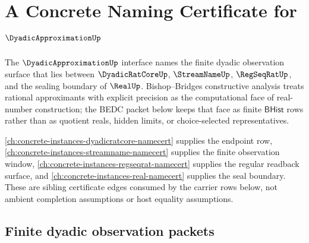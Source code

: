 \chapter{A Concrete Naming Certificate for $\DyadicApproximationUp$}
\label{ch:concrete-instances-dyadicapproximation-namecert}

The $\DyadicApproximationUp$ interface names the finite dyadic observation surface that lies between $\DyadicRatCoreUp$, $\StreamNameUp$, $\RegSeqRatUp$, and the sealing boundary of $\RealUp$. Bishop--Bridges constructive analysis treats rational approximants with explicit precision as the computational face of real-number construction; the BEDC packet below keeps that face as finite $\mathsf{BHist}$ rows rather than as quotient reals, hidden limits, or choice-selected representatives.

\autoref{ch:concrete-instances-dyadicratcore-namecert} supplies the endpoint row, \autoref{ch:concrete-instances-streamname-namecert} supplies the finite observation window, \autoref{ch:concrete-instances-regseqrat-namecert} supplies the regular readback surface, and \autoref{ch:concrete-instances-real-namecert} supplies the seal boundary. These are sibling certificate edges consumed by the carrier rows below, not ambient completion assumptions or host equality assumptions.

\section{Finite dyadic observation packets}
\label{sec:dyadicapproximation-finite-packets}

